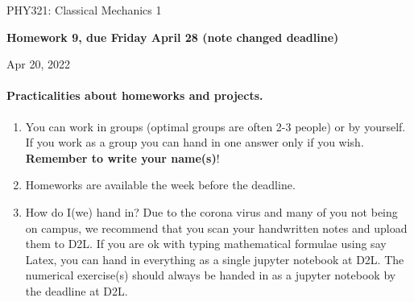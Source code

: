 \documentclass[%
oneside,                 %
final,                   %
10pt]{article}
\begin{document}

\newcommand{\exercisesection}[1]{\subsection*{#1}}






\thispagestyle{empty}

\begin{center}
{\LARGE\bf
\begin{spacing}{1.25}
PHY321: Classical Mechanics 1
\end{spacing}
}
\end{center}


\begin{center}
{\bf Homework 9, due Friday  April 28 (note changed deadline)${}^{}$} \\ [0mm]
\end{center}

\begin{center}
\end{center}
    

\begin{center}
Apr 20, 2022
\end{center}

\vspace{1cm}


\paragraph{Practicalities about  homeworks and projects.}
\begin{enumerate}
\item You can work in groups (optimal groups are often 2-3 people) or by yourself. If you work as a group you can hand in one answer only if you wish. \textbf{Remember to write your name(s)}!

\item Homeworks are available  the week before the deadline. 

\item How do I(we)  hand in?  Due to the corona virus and many of you not being on campus, we recommend that you scan your handwritten notes and upload them to D2L. If you are ok with typing mathematical formulae using say Latex, you can hand in everything as a single jupyter notebook at D2L. The numerical exercise(s) should always be handed in as a jupyter notebook by the deadline at D2L. 
\end{enumerate}
\end{document}
